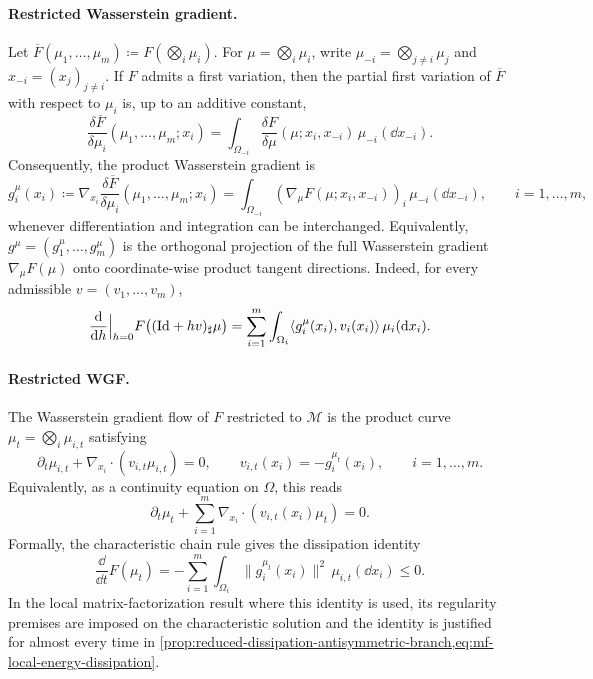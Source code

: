 \paragraph{Restricted Wasserstein gradient.}
Let $\overline F(\mu_1,\ldots,\mu_m)\coloneqq F(\bigotimes_i\mu_i)$.  For
$\mu=\bigotimes_i\mu_i$, write $\mu_{-i}=\bigotimes_{j\neq i}\mu_j$ and
$x_{-i}=(x_j)_{j\neq i}$.  If $F$ admits a first variation, then the partial first
variation of $\overline F$ with respect to $\mu_i$ is, up to an additive constant,
\begin{equation}
    \frac{\delta \overline F}{\delta \mu_i}(\mu_1,\ldots,\mu_m;x_i)
    =
    \int_{\Omega_{-i}}
    \frac{\delta F}{\delta\mu}(\mu;x_i,x_{-i})\,\mu_{-i}(\dd x_{-i}).
\end{equation}
Consequently, the product Wasserstein gradient is
\begin{equation}
    g_i^\mu(x_i)
    \coloneqq
    \nabla_{x_i}\frac{\delta \overline F}{\delta \mu_i}(\mu_1,\ldots,\mu_m;x_i)
    =
    \int_{\Omega_{-i}}
    \left(\nabla_\mu F(\mu;x_i,x_{-i})\right)_i\,\mu_{-i}(\dd x_{-i}),
    \qquad i=1,\ldots,m,
\end{equation}
whenever differentiation and integration can be interchanged.  Equivalently,
$g^\mu=(g_1^\mu,\ldots,g_m^\mu)$ is the orthogonal projection of the full Wasserstein
gradient $\nabla_\mu F(\mu)$ onto coordinate-wise product tangent directions.
Indeed, for every admissible $v=(v_1,\ldots,v_m)$,
\begin{equation}
    \frac{\dd}{\dd h}\Big|_{h=0}F\bigl((\mathrm{Id}+h v)_\sharp\mu\bigr)
    =
    \sum_{i=1}^m \int_{\Omega_i}\langle g_i^\mu(x_i),v_i(x_i)\rangle\,\mu_i(\dd x_i).
\end{equation}

\paragraph{Restricted WGF.}
The Wasserstein gradient flow of $F$ restricted to $\mathcal M$ is the product curve
$\mu_t=\bigotimes_i\mu_{i,t}$ satisfying
\begin{equation}
    \partial_t\mu_{i,t}
    + \nabla_{x_i}\cdot\left(v_{i,t}\mu_{i,t}\right)=0,
    \qquad
    v_{i,t}(x_i)=-g_i^{\mu_t}(x_i),
    \qquad i=1,\ldots,m .
\end{equation}
Equivalently, as a continuity equation on $\Omega$, this reads
\begin{equation}
    \partial_t\mu_t
    + \sum_{i=1}^m \nabla_{x_i}\cdot\left(v_{i,t}(x_i)\mu_t\right)=0.
\end{equation}
Formally, the characteristic chain rule gives the dissipation identity
\begin{equation}
    \frac{\dd}{\dd t}F(\mu_t)
    =
    -\sum_{i=1}^m \int_{\Omega_i}\|g_i^{\mu_t}(x_i)\|^2\,\mu_{i,t}(\dd x_i)
    \le 0.
\end{equation}
In the local matrix-factorization result where this identity is used, its
regularity premises are imposed on the characteristic solution and the
identity is justified for almost every time in
\cref{prop:reduced-dissipation-antisymmetric-branch,eq:mf-local-energy-dissipation}.
